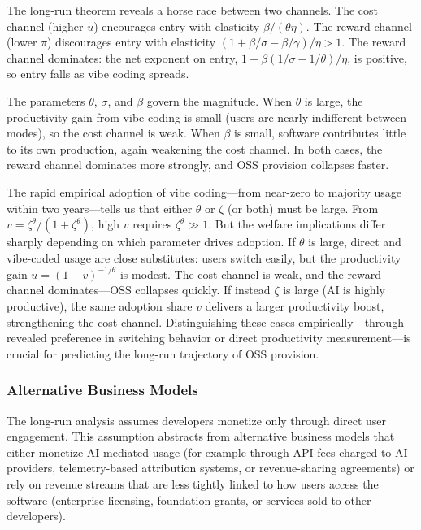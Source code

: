 \documentclass[11pt,a4paper]{article}
\theoremstyle{definition}
\theoremstyle{remark}
\begin{document}
The long-run theorem reveals a horse race between two channels. The cost
channel (higher \(u\)) encourages entry with elasticity
\(\beta/(\theta\eta)\). The reward channel (lower \(\pi\)) discourages
entry with elasticity \((1 + \beta/\sigma - \beta/\gamma)/\eta > 1\).
The reward channel dominates: the net exponent on entry,
\(1 + \beta(1/\sigma - 1/\theta)/\eta\), is positive, so entry falls as vibe coding spreads.

The parameters \(\theta\), \(\sigma\), and \(\beta\) govern the
magnitude. When \(\theta\) is large, the productivity gain from vibe
coding is small (users are nearly indifferent between modes), so the
cost channel is weak. When \(\beta\) is small, software contributes
little to its own production, again weakening the cost channel. In both
cases, the reward channel dominates more strongly, and OSS provision
collapses faster.

The rapid empirical adoption of vibe coding---from near-zero to majority
usage within two years---tells us that either \(\theta\) or \(\zeta\)
(or both) must be large. From \(v = \zeta^\theta/(1+\zeta^\theta)\),
high \(v\) requires \(\zeta^\theta \gg 1\). But the welfare implications
differ sharply depending on which parameter drives adoption. If
\(\theta\) is large, direct and vibe-coded usage are close substitutes:
users switch easily, but the productivity gain \(u = (1-v)^{-1/\theta}\)
is modest. The cost channel is weak, and the reward channel
dominates---OSS collapses quickly. If instead \(\zeta\) is large (AI is
highly productive), the same adoption share \(v\) delivers a larger
productivity boost, strengthening the cost channel. Distinguishing these
cases empirically---through revealed preference in switching behavior or
direct productivity measurement---is crucial for predicting the long-run
trajectory of OSS provision.

\subsubsection{Alternative Business Models}\label{alternative-business-models}

The long-run analysis assumes developers monetize only through direct user engagement. This assumption abstracts from alternative business models that either monetize AI-mediated usage (for example through API fees charged to AI providers, telemetry-based attribution systems, or revenue-sharing agreements) or rely on revenue streams that are less tightly linked to how users access the software (enterprise licensing, foundation grants, or services sold to other developers).
\end{document}
